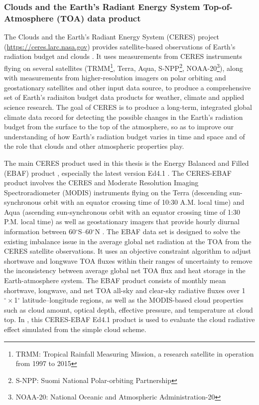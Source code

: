 \subsubsection{Clouds and the Earth’s Radiant Energy System  Top-of-Atmosphere (TOA) data product}

The Clouds and the Earth’s Radiant Energy System (CERES) project (\url{https://ceres.larc.nasa.gov}) provides satellite-based observations of Earth's radiation budget and clouds \citep{Wielicki1996clouds}. It uses measurements from CERES instruments flying on several satellites (TRMM\footnote{TRMM: Tropical Rainfall Measuring Mission, a research satellite in operation from 1997 to 2015}, Terra, Aqua, S-NPP\footnote{S-NPP: Suomi National Polar-orbiting Partnership}, NOAA-20\footnote{NOAA-20: National Oceanic and Atmospheric Administration-20}), along with measurements from higher-resolution imagers on polar orbiting and geostationary satellites and other input data source, to produce a comprehensive set of Earth's radiaiton budget data products for weather, climate and applied science research. The goal of CERES is to produce a long-term, integrated global climate data record for detecting the possible changes in the Earth’s radiation budget from the surface to the top of the atmosphere, so as to improve our understanding of how Earth’s radiation budget varies in time and space and of the role that clouds and other atmospheric properties play.

The main CERES product used in this thesis is the Energy Balanced and Filled (EBAF) product \citep[CERES-EBAF hereafter;][]{Loeb2009}, especially the latest version Ed4.1 \citep{Loeb2018}. The CERES-EBAF product involves the CERES and Moderate Resolution Imaging Spectroradiometer (MODIS) instruments flying on the Terra (descending sun-synchronous orbit with an equator crossing time of 10:30 A.M. local time) and Aqua (ascending sun-synchronous orbit with an equator crossing time of 1:30 P.M. local time) as well as geostationary imagers that provide hourly diurnal information between 60$^\circ$S--60$^\circ$N \citep{Loeb2018}. The EBAF data set is designed to solve the existing imbalance issue in the average global net radiation at the TOA from the CERES satellite observations. It uses an objective constraint algorithm to adjust shortwave and longwave TOA fluxes within their ranges of uncertainty to remove the inconsistency between average global net TOA flux and heat storage in the Earth-atmosphere system. The EBAF product consists of monthly mean shortwave, longwave, and net TOA all-sky and clear-sky radiative fluxes over 1$^\circ \times$1$^\circ$ latitude–longitude regions, as well as the MODIS-based cloud properties such as cloud amount, optical depth, effective pressure, and temperature at cloud top. In , this CERES-EBAF Ed4.1 product is used to evaluate the cloud radiative effect simulated from the simple cloud scheme.

